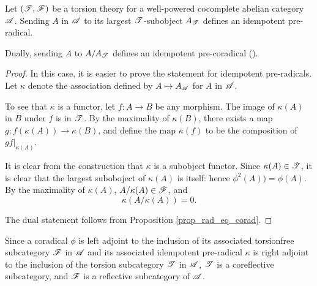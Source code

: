 \begin{prop}\label{prop_tt_to_corad}
Let $(\mathscr{T}, \mathscr{F})$ be a torsion theory for a well-powered
cocomplete abelian category $\mathscr{A}$. 
Sending $A$ in $\mathscr{A}$ to its largest $\mathscr{T}$-subobject 
$A_{\mathscr{T}}$ defines an idempotent pre-radical.

Dually, sending $A$ to $A/A_{\mathscr{T}}$ defines an idempotent 
pre-coradical (\CF \cite[I2.8]{BJV}).
\end{prop}
\begin{proof}
In this case, it is easier to prove the statement for idempotent 
pre-radicals. Let $\kappa$ denote the association defined by $A 
\mapsto A_{\mathscr{A}}$ for $A$ in $\mathscr{A}$.

To see that $\kappa$ is a functor, let $f: A \to B$ be any 
morphism. The image of $\kappa(A)$ in $B$ under $f$ is in 
$\mathscr{T}$. By the maximality of $\kappa(B)$, there exists a map 
$g: f(\kappa(A)) \to \kappa(B)$, and define the map $\kappa(f)$ 
to be the composition of $g f|_{\kappa(A)}$.

It is clear from the construction that $\kappa$ is a subobject 
functor. Since $\kappa(A) \in \mathscr{T}$, it is clear that the 
largest suboboject of $\kappa(A)$ is itself: hence $\phi^2(A)) = 
\phi(A)$. By the maximality of $\kappa(A)$, $A/\kappa(A) \in 
\mathscr{F}$, and 
\[
\kappa(A/\kappa(A)) = 0.
\]

The dual statement follows from Proposition \ref{prop_rad_eq_corad}.
\end{proof}

\begin{rmk}
Since a coradical $\phi$ is left adjoint to the inclusion of its 
associated torsionfree subcategory $\mathscr{F}$ in $\mathscr{A}$ and its 
associated idempotent pre-radical $\kappa$ is right adjoint to the
inclusion of the torsion subcategory $\mathscr{T}$ in $\mathscr{A}$, $\mathscr{T}$
is a coreflective subcategory, and $\mathscr{F}$ is a reflective 
subcategory of $\mathscr{A}$.
\end{rmk}

